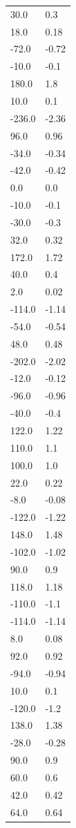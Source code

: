 \begin{longtable}{ll}
30.0 & 0.3 \\
18.0 & 0.18 \\
-72.0 & -0.72 \\
-10.0 & -0.1 \\
180.0 & 1.8 \\
10.0 & 0.1 \\
-236.0 & -2.36 \\
96.0 & 0.96 \\
-34.0 & -0.34 \\
-42.0 & -0.42 \\
0.0 & 0.0 \\
-10.0 & -0.1 \\
-30.0 & -0.3 \\
32.0 & 0.32 \\
172.0 & 1.72 \\
40.0 & 0.4 \\
2.0 & 0.02 \\
-114.0 & -1.14 \\
-54.0 & -0.54 \\
48.0 & 0.48 \\
-202.0 & -2.02 \\
-12.0 & -0.12 \\
-96.0 & -0.96 \\
-40.0 & -0.4 \\
122.0 & 1.22 \\
110.0 & 1.1 \\
100.0 & 1.0 \\
22.0 & 0.22 \\
-8.0 & -0.08 \\
-122.0 & -1.22 \\
148.0 & 1.48 \\
-102.0 & -1.02 \\
90.0 & 0.9 \\
118.0 & 1.18 \\
-110.0 & -1.1 \\
-114.0 & -1.14 \\
8.0 & 0.08 \\
92.0 & 0.92 \\
-94.0 & -0.94 \\
10.0 & 0.1 \\
-120.0 & -1.2 \\
138.0 & 1.38 \\
-28.0 & -0.28 \\
90.0 & 0.9 \\
60.0 & 0.6 \\
42.0 & 0.42 \\
64.0 & 0.64 \\

\end{longtable}
